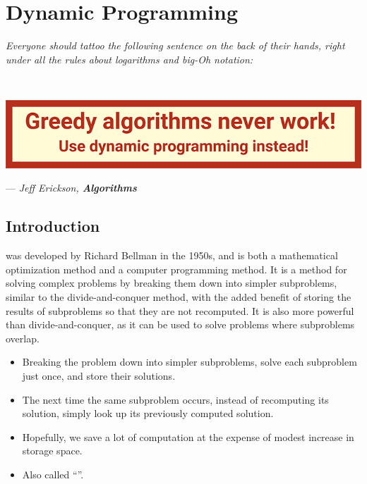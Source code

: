 \chapter{Dynamic Programming}
\vspace{-1em}
\begin{center}
    \begin{minipage}[t]{0.8\linewidth}
        \textit{Everyone should tattoo the following sentence on the back of their hands, right under all the rules about logarithms and big-Oh notation:}
    \end{minipage}

    {~~~}

    \vspace{0.5em}
    \includegraphics[width=0.45\linewidth]{figures/greedy-never-works.png}
    \begin{flushright}
        --- \textit{Jeff Erickson, \textbf{Algorithms}}
    \end{flushright}
\end{center}

\section{Introduction}

 was developed by Richard Bellman in the 1950s, and is both a mathematical optimization method and a computer programming method. It is a method for solving complex problems by breaking them down into simpler subproblems, similar to the divide-and-conquer method, with the added benefit of storing the results of subproblems so that they are not recomputed. It is also more powerful than divide-and-conquer, as it can be used to solve problems where subproblems overlap.

\begin{itemize}
    \item Breaking the problem down into simpler subproblems, solve each subproblem just once, and store their solutions. 
    \item The next time the same subproblem occurs, instead of recomputing its solution, simply look up its previously computed solution.
    \item Hopefully, we save a lot of computation at the expense of modest increase in storage space. 
    \item Also called ``''.
\end{itemize}

